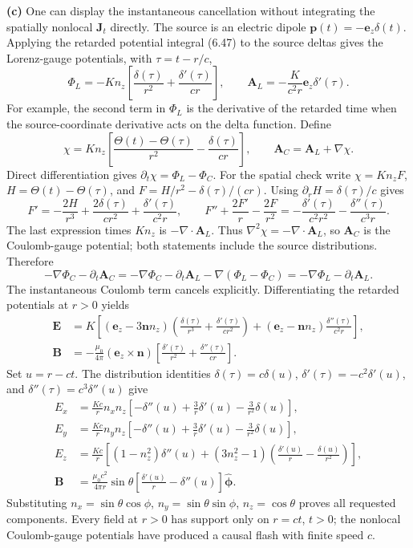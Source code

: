 \textbf{(c)} One can display the instantaneous cancellation without
integrating the spatially nonlocal $\mathbf J_t$ directly. The source is
an electric dipole $\mathbf p(t)=-\mathbf e_z\delta(t)$. Applying the
retarded potential integral (6.47) to the source deltas gives the Lorenz-gauge
potentials, with $\tau=t-r/c$,
\[
\Phi_L=-K n_z\left[\frac{\delta(\tau)}{r^2}
+\frac{\delta'(\tau)}{cr}\right],\qquad
\mathbf A_L=-\frac K{c^2r}\mathbf e_z\delta'(\tau).
\]
For example, the second term in $\Phi_L$ is the derivative of the retarded
time when the source-coordinate derivative acts on the delta function.
Define
\[
\chi=K n_z\left[\frac{\Theta(t)-\Theta(\tau)}{r^2}
-\frac{\delta(\tau)}{cr}\right],\qquad
\mathbf A_C=\mathbf A_L+\nabla\chi.
\]
Direct differentiation gives $\partial_t\chi=\Phi_L-\Phi_C$.
For the spatial check write $\chi=K n_zF$,
$H=\Theta(t)-\Theta(\tau)$, and $F=H/r^2-\delta(\tau)/(cr)$.
Using $\partial_r H=\delta(\tau)/c$ gives
\[
F'=-\frac{2H}{r^3}+\frac{2\delta(\tau)}{cr^2}
+\frac{\delta'(\tau)}{c^2r},\qquad
F''+\frac{2F'}r-\frac{2F}{r^2}
=-\frac{\delta'(\tau)}{c^2r^2}-\frac{\delta''(\tau)}{c^3r}.
\]
The last expression times $K n_z$ is
$-\nabla\cdot\mathbf A_L$. Thus
$\nabla^2\chi=-\nabla\cdot\mathbf A_L$, so $\mathbf A_C$ is the
Coulomb-gauge potential; both statements include the source distributions.
Therefore
\[
-\nabla\Phi_C-\partial_t\mathbf A_C
=-\nabla\Phi_C-\partial_t\mathbf A_L-\nabla(\Phi_L-\Phi_C)
=-\nabla\Phi_L-\partial_t\mathbf A_L.
\]
The instantaneous Coulomb term cancels explicitly. Differentiating the
retarded potentials at $r>0$ yields
\begin{align*}
\mathbf E&=K\left[(\mathbf e_z-3\mathbf n n_z)
\left(\frac{\delta(\tau)}{r^3}+\frac{\delta'(\tau)}{cr^2}\right)
+(\mathbf e_z-\mathbf n n_z)\frac{\delta''(\tau)}{c^2r}\right],\\
\mathbf B&=-\frac{\mu_0}{4\pi}(\mathbf e_z\times\mathbf n)
\left[\frac{\delta'(\tau)}{r^2}+\frac{\delta''(\tau)}{cr}\right].
\end{align*}
Set $u=r-ct$. The distribution identities
$\delta(\tau)=c\delta(u)$, $\delta'(\tau)=-c^2\delta'(u)$, and
$\delta''(\tau)=c^3\delta''(u)$ give
\begin{align*}
\boxed{E_x}&=\boxed{\frac{Kc}{r}n_xn_z
\left[-\delta''(u)+\frac3r\delta'(u)-\frac3{r^2}\delta(u)\right]},\\
E_y&=\frac{Kc}{r}n_yn_z
\left[-\delta''(u)+\frac3r\delta'(u)-\frac3{r^2}\delta(u)\right],\\
\boxed{E_z}&=\boxed{\frac{Kc}{r}\left[(1-n_z^2)\delta''(u)
+(3n_z^2-1)\left(\frac{\delta'(u)}r-\frac{\delta(u)}{r^2}\right)\right]},\\
\mathbf B&=\frac{\mu_0c^2}{4\pi r}\sin\theta
\left[\frac{\delta'(u)}r-\delta''(u)\right]\hat{\boldsymbol\phi}.
\end{align*}
Substituting $n_x=\sin\theta\cos\phi$, $n_y=\sin\theta\sin\phi$,
$n_z=\cos\theta$ proves all requested components. Every field at $r>0$
has support only on $r=ct$, $t>0$; the nonlocal Coulomb-gauge potentials
have produced a causal flash with finite speed $c$.

